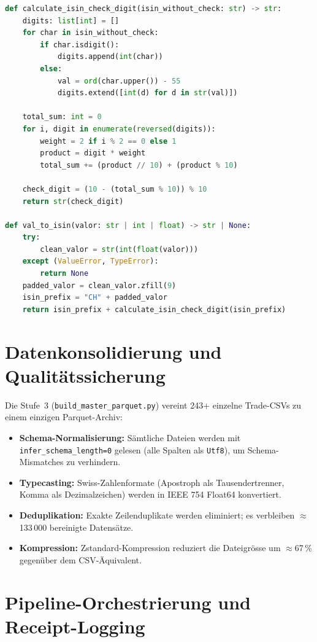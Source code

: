 \documentclass[12pt, a4paper, oneside]{report}
\newcommand{\code}[1]{\texttt{\small\textcolor{darknavy}{#1}}}
\begin{document}
\begin{lstlisting}[language=Python, caption={ISIN-Berechnung\;---\;Luhn-Algorithmus (fetcher.py)}]
def calculate_isin_check_digit(isin_without_check: str) -> str:
    digits: list[int] = []
    for char in isin_without_check:
        if char.isdigit():
            digits.append(int(char))
        else:
            val = ord(char.upper()) - 55
            digits.extend([int(d) for d in str(val)])

    total_sum: int = 0
    for i, digit in enumerate(reversed(digits)):
        weight = 2 if i % 2 == 0 else 1
        product = digit * weight
        total_sum += (product // 10) + (product % 10)

    check_digit = (10 - (total_sum % 10)) % 10
    return str(check_digit)

def val_to_isin(valor: str | int | float) -> str | None:
    try:
        clean_valor = str(int(float(valor)))
    except (ValueError, TypeError):
        return None
    padded_valor = clean_valor.zfill(9)
    isin_prefix = "CH" + padded_valor
    return isin_prefix + calculate_isin_check_digit(isin_prefix)
\end{lstlisting}

\section{Datenkonsolidierung und Qualit\"atssicherung}

Die Stufe~3 (\code{build\_master\_parquet.py}) vereint 243+ einzelne Trade-CSVs zu einem einzigen Parquet-Archiv:

\begin{itemize}
  \item \textbf{Schema-Normalisierung:} S\"amtliche Dateien werden mit \code{infer\_schema\_length=0} gelesen (alle Spalten als \code{Utf8}), um Schema-Mismatches zu verhindern.
  \item \textbf{Typecasting:} Swiss-Zahlenformate (Apostroph als Tausendertrenner, Komma als Dezimalzeichen) werden in IEEE 754 Float64 konvertiert.
  \item \textbf{Deduplikation:} Exakte Zeilenduplikate werden eliminiert; es verbleiben $\approx$133\,000 bereinigte Datens\"atze.
  \item \textbf{Kompression:} Zstandard-Kompression reduziert die Dateigr\"osse um $\approx$67\,\% gegen\"uber dem CSV-\"Aquivalent.
\end{itemize}

\section{Pipeline-Orchestrierung und Receipt-Logging}
\end{document}
